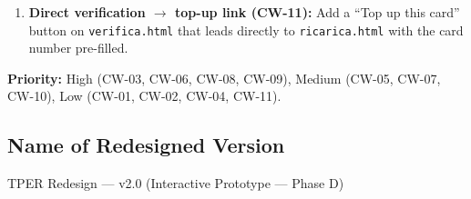 \begin{tcolorbox}[colback=backgroundColor,colframe=accentGreen,arc=2mm]
\begin{enumerate}[leftmargin=*]
 \item \textbf{Direct verification $\rightarrow$ top-up link (CW-11):} Add a ``Top up this card'' button on \texttt{verifica.html} that leads directly to \texttt{ricarica.html} with the card number pre-filled.
\end{enumerate}

\vspace{0.3cm}
\noindent\textbf{Priority:} High (CW-03, CW-06, CW-08, CW-09), Medium (CW-05, CW-07, CW-10), Low (CW-01, CW-02, CW-04, CW-11).
\end{tcolorbox}

\vspace{0.3cm}

\subsection*{Name of Redesigned Version}
\begin{tcolorbox}[colback=backgroundColor,colframe=borderColor,arc=2mm]
\small
TPER Redesign --- v2.0 (Interactive Prototype --- Phase D)
\end{tcolorbox}


